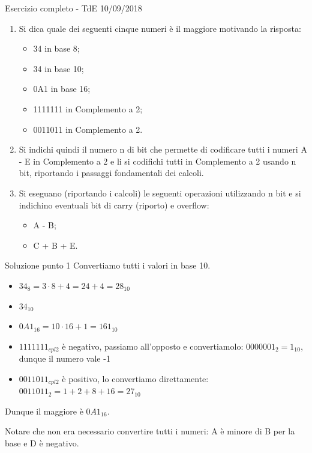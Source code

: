 \documentclass[9pt, format=169]{beamer}
\begin{document}
\begin{frame}{Esercizio completo - TdE 10/09/2018}
\begin{enumerate}
	\item Si dica quale dei seguenti cinque numeri è il maggiore motivando la risposta:
	\begin{itemize}
		\item 34 in base 8;
		\item 34 in base 10;
		\item 0A1 in base 16;
		\item 1111111 in Complemento a 2;
		\item 0011011 in Complemento a 2.
	\end{itemize}
	
	\item Si indichi quindi il numero n di bit che permette di codificare tutti i numeri A - E in Complemento a 2 e li si codifichi tutti in Complemento a 2 usando n bit, riportando i passaggi fondamentali dei calcoli.
	
	\item Si eseguano (riportando i calcoli) le seguenti operazioni utilizzando n bit e si indichino eventuali bit di carry (riporto) e overflow:
	\begin{itemize}
		\item A - B;
		\item C + B + E.
	\end{itemize}
\end{enumerate}
\end{frame}

\begin{frame}{Soluzione punto 1}
Convertiamo tutti i valori in base 10.
	\begin{itemize}
		\item $34_8 = 3 \cdot 8 +  4 = 24+4 = 28_{10}$
		\item $34_{10}$
		\item $0A1_{16} = 10 \cdot 16 + 1 = 161_{10}$
		\item $1111111_{cpl2}$ è negativo, passiamo all'opposto e convertiamolo: $0000001_2 = 1_{10}$, dunque il numero vale -1
		\item $0011011_{cpl2}$ è positivo, lo convertiamo direttamente: $0011011_2 = 1+2+8+16 = 27_{10}$
	\end{itemize}

Dunque il maggiore è $0A1_{16}$.

Notare che non era necessario convertire tutti i numeri: A è minore di B per la base e D è negativo.
\end{frame}
\end{document}
